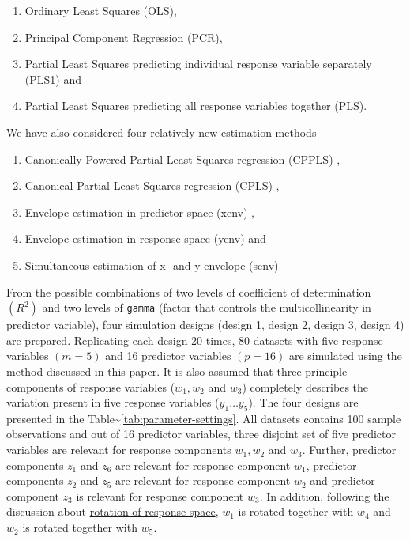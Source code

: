 \documentclass[12pt,A4paper,authoryear]{elsarticle} %
\providecommand{\tightlist}{%
  \setlength{\itemsep}{0pt}\setlength{\parskip}{0pt}}
\theoremstyle{definition}
\theoremstyle{definition}
\theoremstyle{remark}
\begin{document}
\begin{enumerate}
\def\labelenumi{\alph{enumi})}
\tightlist
\item
  Ordinary Least Squares (OLS),
\item
  Principal Component Regression (PCR),
\item
  Partial Least Squares predicting individual response variable
  separately (PLS1) and
\item
  Partial Least Squares predicting all response variables together
  (PLS).
\end{enumerate}

We have also considered four relatively new estimation methods

\begin{enumerate}
\def\labelenumi{\alph{enumi})}
\tightlist
\item
  Canonically Powered Partial Least Squares regression (CPPLS)
  \citep{indahl2009canonical},
\item
  Canonical Partial Least Squares regression (CPLS)
  \citep{indahl2009canonical},
\item
  Envelope estimation in predictor space (xenv)
  \citep{cook2010envelope},
\item
  Envelope estimation in response space (yenv)
  \citep{cook2015foundations} and
\item
  Simultaneous estimation of x- and y-envelope (senv)
  \citep{cook2015simultaneous}
\end{enumerate}

From the possible combinations of two levels of coefficient of
determination \((R^2)\) and two levels of \texttt{gamma} (factor that
controls the multicollinearity in predictor variable), four simulation
designs (design 1, design 2, design 3, design 4) are prepared.
Replicating each design 20 times, 80 datasets with five response
variables \((m=5)\) and 16 predictor variables \((p = 16)\) are
simulated using the method discussed in this paper. It is also assumed
that three principle components of response variables (\(w_1, w_2\) and
\(w_3\)) completely describes the variation present in five response
variables (\(y_1 \ldots y_5\)). The four designs are presented in the
Table\textasciitilde{}\ref{tab:parameter-settings}. All datasets
contains 100 sample observations and out of 16 predictor variables,
three disjoint set of five predictor variables are relevant for response
components \(w_1, w_2\) and \(w_3\). Further, predictor components
\(z_1\) and \(z_6\) are relevant for response component \(w_1\),
predictor components \(z_2\) and \(z_5\) are relevant for response
component \(w_2\) and predictor component \(z_3\) is relevant for
response component \(w_3\). In addition, following the discussion about
\protect\hyperlink{rotation-of-response-space}{rotation of response
space}, \(w_1\) is rotated together with \(w_4\) and \(w_2\) is rotated
together with \(w_5\).
\end{document}
